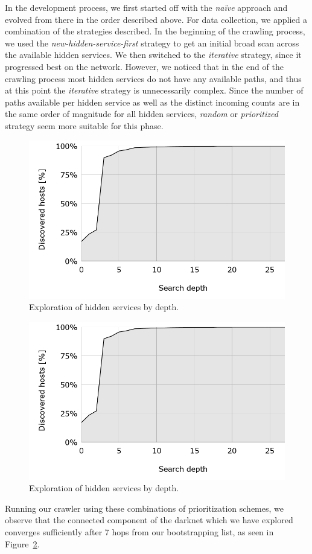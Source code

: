 In the development process, we first started off with the \emph{na\"ive} approach and evolved from there in the order described above. For data collection, we applied a combination of the strategies described. In the beginning of the crawling process, we used the  \emph{new-hidden-service-first} strategy to get an initial broad scan across the available hidden services. We then switched to the \emph{iterative} strategy, since it progressed best on the network. However, we noticed that in the end of the crawling process most hidden services do not have any available paths, and thus at this point the \emph{iterative} strategy is unnecessarily complex. Since the number of paths available per hidden service as well as the distinct incoming counts are in the same order of magnitude for all hidden services,  \emph{random} or  \emph{prioritized} strategy seem more suitable for this phase.

\ifdgruyter
  \begin{figure}[H]
      \centering
      \includegraphics[width=\linewidth]{images/PercentageByDepth.png}
      \caption{Exploration of hidden services by depth.}
      \label{fig:percentageByDepth}
  \end{figure}
\fi
\iflncs
  \begin{figure}[H]
      \centering
      \includegraphics[width=0.65\linewidth]{images/PercentageByDepth.png}
      \caption{Exploration of hidden services by depth.}
      \label{fig:percentageByDepth}
  \end{figure}
\fi
Running our crawler using these combinations of prioritization schemes, we observe that the connected component of the darknet which we have explored converges sufficiently after 7 hops from our bootstrapping list, as seen in Figure~\ref{fig:percentageByDepth}.


